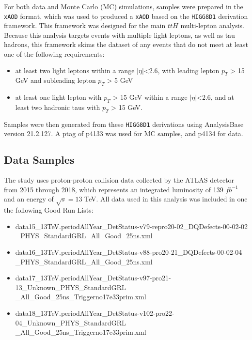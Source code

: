 
For both data and Monte Carlo (MC) simulations, samples were prepared in the \verb|xAOD| format, which was used to produced a \verb|xAOD| based on the \verb|HIGG8D1| derivation framework. This framework was designed for the main $t\bar{t}H$ multi-lepton analysis. Because this analysis targets events with multiple light leptons, as well as tau hadrons, this framework skims the dataset of any events that do not meet at least one of the following requirements:

\begin{itemize}
    \item at least two light leptons within a range $|\eta|$<2.6, with leading lepton $p_{T}$ > 15 GeV and subleading lepton $p_{T}$ > 5 GeV
    \item at least one light lepton with $p_{T}$ > 15 GeV within a range $|\eta|$<2.6, and at least two hadronic taus with $p_{T}$ > 15 GeV.
\end{itemize}

Samples were then generated from these \verb|HIGG8D1| derivations using AnalysisBase version 21.2.127. A ptag of p4133 was used for MC samples, and p4134 for data.

\subsection{Data Samples}

The study uses proton-proton collision data collected by the ATLAS detector from 2015 through 2018, which represents an integrated luminosity of 139 $fb^{-1}$ and an energy of $\sqrt{s} = 13$ TeV. All data used in this analysis was included in one the following Good Run Lists:

\begin{itemize}
    \item data15\_13TeV.periodAllYear\_DetStatus-v79-repro20-02\_DQDefects-00-02-02\\\_PHYS\_StandardGRL\_All\_Good\_25ns.xml
    \item data16\_13TeV.periodAllYear\_DetStatus-v88-pro20-21\_DQDefects-00-02-04\\\_PHYS\_StandardGRL\_All\_Good\_25ns.xml 
    \item data17\_13TeV.periodAllYear\_DetStatus-v97-pro21-13\_Unknown\_PHYS\_StandardGRL\\\_All\_Good\_25ns\_Triggerno17e33prim.xml
    \item data18\_13TeV.periodAllYear\_DetStatus-v102-pro22-04\_Unknown\_PHYS\_StandardGRL\\\_All\_Good\_25ns\_Triggerno17e33prim.xml
\end{itemize}

